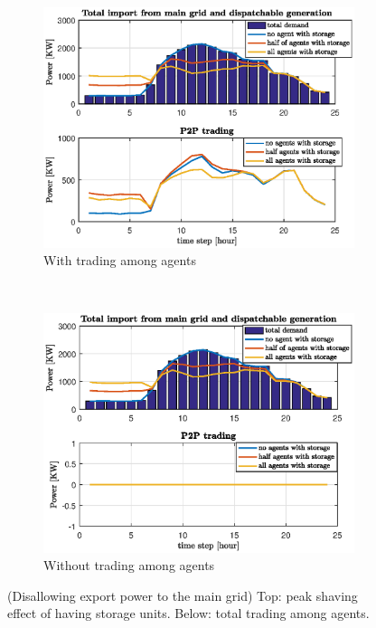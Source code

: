 \documentclass[10pt]{article}
\newtheorem{definitiox	n}{Definition}{\it}{}
\newcommand{\0}{\mathbf{0}}
\newcommand{\1}{\mathbf{1}}
\begin{document}
\begin{figure}[h]
	\centering
	\begin{subfigure}{0.5\textwidth}
		\centering
		\includegraphics[width=1\linewidth]{simA_sto_37_4wtrade.eps}
		\caption{With trading among agents}
	\end{subfigure}%
	~ 
	\begin{subfigure}{0.5\textwidth}
		\centering
		\includegraphics[width=1\linewidth]{simA_sto_37_4notrade.eps}
		\caption{Without trading among agents}
	\end{subfigure}
	\caption{(Disallowing export power to the main grid) Top: peak shaving effect of having storage units. Below: total trading among agents.}
	\label{fig:sim_A2}
\end{figure}
\end{document}
